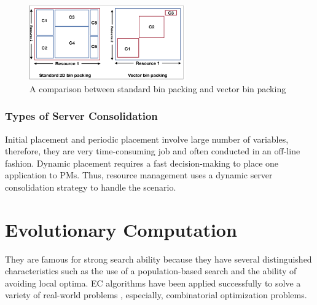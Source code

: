 \begin{figure}
	\centering
	\includegraphics[width=0.6\textwidth]{pics/bin_packing_problem.png}
	\caption{A comparison between standard bin packing and vector bin packing}
	\label{fig:bin_packing_problem}
\end{figure}

\subsubsection{Types of Server Consolidation}


 Initial placement and periodic placement involve large number of variables, therefore, they are very time-consuming job and often conducted in an off-line fashion. Dynamic placement requires a fast decision-making to place one application to PMs. Thus, resource management uses a dynamic server consolidation strategy to handle the scenario. 



\section{Evolutionary Computation}
 They are famous for strong search ability because they have several distinguished characteristics such as the use of a population-based search and the ability of avoiding local optima. EC algorithms have been applied successfully to solve a variety of real-world problems \cite{Engelbrecht:dm}, especially, combinatorial optimization problems.


